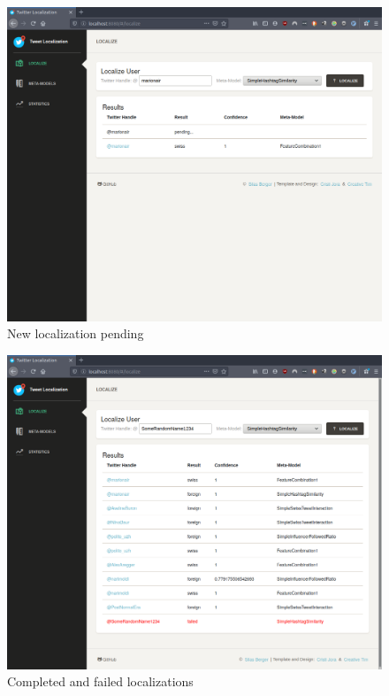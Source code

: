 \documentclass[10pt,a4paper]{article}
\begin{document}
\begin{figure}
	\centering
	\includegraphics[scale=0.25]{localize-one-pending}
	\caption{New localization pending}
	\label{fig:localize-one-pending}
\end{figure}

\begin{figure}
	\centering
	\includegraphics[scale=0.25]{localize-many-results}
	\caption{Completed and failed localizations}
	\label{fig:localize-many-results}
\end{figure}
\end{document}
